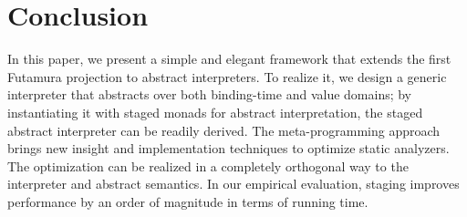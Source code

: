 \section{Conclusion}

In this paper, we present a simple and elegant framework that extends the first
Futamura projection to abstract interpreters.
To realize it, we design a generic interpreter that abstracts over both
binding-time and value domains; by instantiating it with staged monads for
abstract interpretation, the staged abstract interpreter can be readily derived.
The meta-programming approach brings new insight and implementation techniques
to optimize static analyzers. The optimization can be realized in a completely
orthogonal way to the interpreter and abstract semantics.
In our empirical evaluation, staging improves performance by an order of magnitude
in terms of running time.
